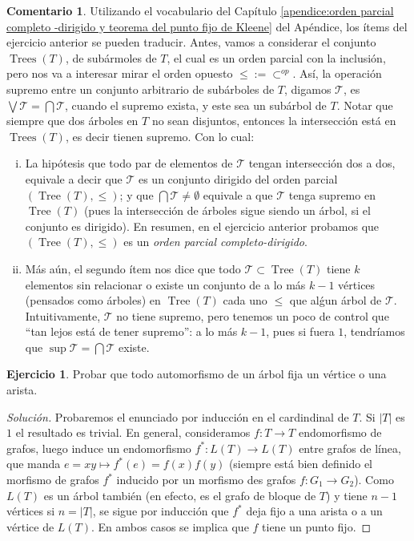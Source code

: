 \documentclass[12pt]{report}
\theoremstyle{plain}
\theoremstyle{definition}
\newtheorem{remark}[theorem]{Comentario}
\newtheorem{exercise}[theorem]{Ejercicio}
\newenvironment{solution}{\begin{proof}[Solución]}{\end{proof}}
\newcommand{\abs}[1]{\left \vert #1 \right \vert}
\begin{document}
\begin{remark}
Utilizando el vocabulario del Capítulo \ref{apendice:orden parcial completo
-dirigido y teorema del punto fijo de Kleene} del Apéndice, los ítems del ejercicio anterior se pueden traducir.
Antes, vamos a considerar el conjunto $\operatorname{Trees} (T)$, de subármoles de $T$, el cual es un orden parcial
con la inclusión, pero nos va a interesar mirar el orden opuesto $\leq:= \subset^{op}$. Así, la operación supremo
entre un conjunto arbitrario de subárboles de $T$, digamos $\mathcal T$, es $\bigvee \mathcal T = \bigcap \mathcal T$, cuando el supremo exista, y este sea un subárbol de $T$. Notar que siempre que dos árboles en $T$ no sean disjuntos, entonces la intersección está en $\operatorname{Trees} (T)$, es decir tienen supremo. Con lo cual:
\begin{enumerate}[(i)]
\item La hipótesis que todo par de elementos de $\mathcal T$ tengan intersección dos a dos, equivale a decir que $\mathcal T$ es
un
conjunto dirigido del orden parcial $(\operatorname{Tree} (T), \leq )$; y que $\bigcap \mathcal T \neq \emptyset$
equivale a que $\mathcal T$ tenga supremo en $\operatorname{Tree} (T)$ (pues la intersección de árboles sigue siendo
un árbol, si el conjunto es dirigido). En resumen, en el ejercicio anterior probamos que $(\operatorname{Tree} (T), \leq)$ es un \textit{orden parcial completo-dirigido}.
\item Más aún, el segundo ítem nos dice que todo $\mathcal T \subset \operatorname{Tree}(T)$ tiene $k$ elementos sin
relacionar o existe un conjunto de a lo más $k-1$ vértices (pensados como árboles) en $\operatorname{Tree} (T)$ cada
uno $\leq$ que alǵun árbol de $\mathcal T$. Intuitivamente, $\mathcal T$ no tiene supremo, pero tenemos un poco de
control que ``tan lejos está de tener supremo'': a lo más $k-1$, pues si fuera $1$, tendríamos que $\sup \mathcal T = \bigcap \mathcal T $ existe.
\end{enumerate}
\end{remark}



\begin{exercise}\label{ejercicio:todo automorfismo de un árbol tiene un vertice o arista fijos}
Probar que todo automorfismo de un árbol fija un vértice o una arista.
\end{exercise}
\begin{solution}
Probaremos el enunciado por inducción en el cardindinal de $T$. Si $\abs T$ es $1$ el resultado es trivial.
En general, consideramos $f : T \rightarrow T$ endomorfismo de grafos, luego induce un endomorfismo $f^* : L
(T) \rightarrow L(T)$ entre grafos de línea, que manda $e = xy \mapsto f^*(e) = f(x)f(y)$ (siempre está bien
definido el morfismo de grafos $f^*$ inducido por un morfismo des grafos $f : G_1 \rightarrow G_2$). Como
$L(T)$ es un árbol también (en efecto, es el grafo de bloque de $T$) y tiene $n-1$ vértices si $n= \abs T$,
se sigue por inducción que $f^*$ deja fijo a una arista o a un vértice de $L(T)$. En ambos casos se implica
que $f$ tiene un punto fijo.
\end{solution}
\end{document}
